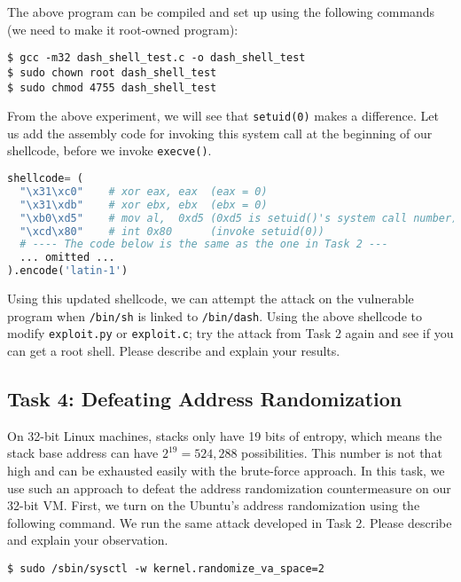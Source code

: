 The above program can be compiled and set up using the following 
commands (we need to make it root-owned \setuid program):

\begin{lstlisting}
$ gcc -m32 dash_shell_test.c -o dash_shell_test
$ sudo chown root dash_shell_test
$ sudo chmod 4755 dash_shell_test
\end{lstlisting}


From the above experiment, we will see that 
\texttt{setuid(0)} makes a difference.  Let us add the assembly 
code for invoking this system call at the beginning of our shellcode, before 
we invoke \texttt{execve()}. 

\begin{lstlisting}[language=python]
shellcode= (
  "\x31\xc0"    # xor eax, eax  (eax = 0)
  "\x31\xdb"    # xor ebx, ebx  (ebx = 0)
  "\xb0\xd5"    # mov al,  0xd5 (0xd5 is setuid()'s system call number)
  "\xcd\x80"    # int 0x80      (invoke setuid(0))
  # ---- The code below is the same as the one in Task 2 ---
  ... omitted ...
).encode('latin-1')
\end{lstlisting}


Using this updated shellcode, we can attempt the attack on the vulnerable
program when \texttt{/bin/sh} is linked to \texttt{/bin/dash}. Using the above shellcode 
to modify \texttt{exploit.py} or \texttt{exploit.c}; try the attack from Task 2 again and see
if you can get a root shell. 
Please describe and explain your results.


\subsection{Task 4: Defeating Address Randomization}

On 32-bit Linux machines, stacks only have 19 bits of entropy, which means the stack base
address can have $2^{19} = 524,288$ possibilities.  This number is not that high and can be
exhausted easily with the brute-force approach. In this task,
we use such an approach to defeat the address randomization countermeasure 
on our 32-bit VM. 
First, we turn on the Ubuntu's address randomization using the 
following command.  We run the same attack
developed in Task 2. Please describe and explain your observation.

\begin{lstlisting}
$ sudo /sbin/sysctl -w kernel.randomize_va_space=2
\end{lstlisting}


